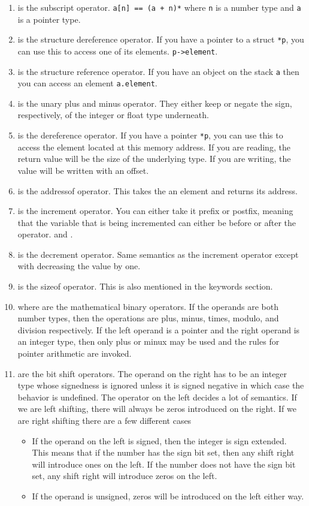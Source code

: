 \begin{enumerate}
	\item \keyword{[]} is the subscript operator. \texttt{a[n] == (a + n)*} where \texttt{n} is a number type and \texttt{a} is a pointer type.
	\item \keyword{->} is the structure dereference operator. If you have a pointer to a struct \texttt{*p}, you can use this to access one of its elements. \texttt{p->element}.
	\item {} is the structure reference operator. If you have an object on the stack \texttt{a} then you can access an element \texttt{a.element}.
	\item {} is the unary plus and minus operator. They either keep or negate the sign, respectively, of the integer or float type underneath.
	\item {} is the dereference operator. If you have a pointer  \texttt{*p}, you can use this to access the element located at this memory address. If you are reading, the return value will be the size of the underlying type. If you are writing, the value will be written with an offset.
	\item {} is the addressof operator. This takes the an element and returns its address.
	\item \keyword{++} is the increment operator. You can either take it prefix or postfix, meaning that the variable that is being incremented can either be before or after the operator.  and .
	\item \keyword{--} is the decrement operator. Same semantics as the increment operator except with decreasing the value by one.
	\item {} is the sizeof operator. This is also mentioned in the keywords section.
	\item {} where  are the mathematical binary operators. If the operands are both number types, then the operations are plus, minus, times, modulo, and division respectively. If the left operand is a pointer and the right operand is an integer type, then only plus or minux may be used and the rules for pointer arithmetic are invoked.
	\item \keyword{>>/<<} are the bit shift operators. The operand on the right has to be an integer type whose signedness is ignored unless it is signed negative in which case the behavior is undefined. The operator on the left decides a lot of semantics. If we are left shifting, there will always be zeros introduced on the right. If we are right shifting there are a few different cases
	      \begin{itemize}
		      \item If the operand on the left is signed, then the integer is sign extended. This means that if the number has the sign bit set, then any shift right will introduce ones on the left. If the number does not have the sign bit set, any shift right will introduce zeros on the left.
		      \item If the operand is unsigned, zeros will be introduced on the left either way.
	      \end{itemize}


\end{enumerate}
